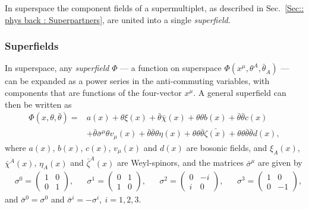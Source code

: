 \documentclass[twoside,english]{uiofysmaster}
\begin{document}
In superspace the component fields of a supermultiplet, as described in Sec.~\ref{Sec:: phys back : Superpartners}, are united into a single \textit{superfield}.





\subsubsection{Superfields}

In superspace, any \textit{superfield }$\Phi$ --- a function on superspace $\Phi(x^{\mu}, \theta^A, \bar{\theta}_{\dot{A}})$ --- can be expanded as a power series in the anti-commuting variables, with components that are functions of the four-vector $x^{\mu}$. A general superfield  can then be written as 
\begin{align}\label{Eq:: phys back : Superfield general}
\Phi(x, \theta, \bar{\theta}) =& a(x) + \theta \xi(x) + \bar{\theta}\bar{\chi}(x) + \theta \theta b(x) + \bar{\theta} \bar{\theta} c(x)\nonumber \\
 &+ \bar{\theta} \bar{\sigma}^{\mu} \theta v_{\mu}(x) + \bar{\theta} \bar{\theta} \theta \eta(x) + \theta \theta \bar{\theta} \bar{\zeta(x)} + \theta \theta \bar{\theta} \bar{\theta} d(x) , 
\end{align}
where $a(x)$, $b(x)$, $c(x)$, $v_{\mu}(x)$ and $d(x)$ are bosonic fields, and $\xi_A(x)$, $\bar{\chi}^{\dot{A}}(x)$, $\eta_A(x)$ and $\bar{\zeta}^{\dot{A}}(x)$ are Weyl-spinors, and the matrices $\bar{\sigma}^{\mu}$ are given by
\begin{align}
&\sigma^0 =  \begin{pmatrix}
1 & 0\\
0 & 1
\end{pmatrix},
&& \sigma^1 =  \begin{pmatrix}
0 & 1\\
1 & 0
\end{pmatrix},
&& \sigma^2 =  \begin{pmatrix}
0 & -i\\
i & 0
\end{pmatrix},
&& \sigma^3 = \begin{pmatrix}
1 & 0\\
0 & -1
\end{pmatrix},
\end{align}
and $\bar{\sigma}^0 = \sigma^0$ and $\bar{\sigma}^i = -\sigma^i,~i=1,2,3$.
\end{document}
